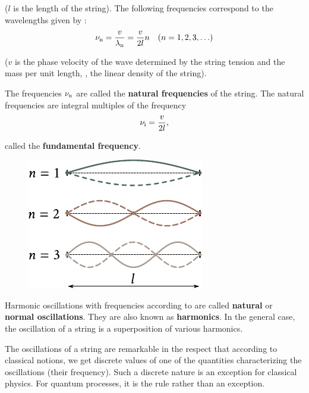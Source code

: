 \noindent
($l$ is the length of the string).
The following frequencies correspond to the wavelengths given by :
\begin{equation}\label{eq:14_61}
	\nu_{\text{n}} = \frac{v}{\lambda_{\text{n}}} = \frac{v}{2l} n \quad (n = 1, 2, 3, \ldots)
\end{equation}

\noindent
($v$ is the phase velocity of the wave determined by the string tension and the mass per unit length, \ie, the linear density of the string).

The frequencies $\nu_{\text{n}}$ are called the \textbf{natural frequencies} of the string.
The natural frequencies are integral multiples of the frequency
\begin{equation*}
	\nu_{\text{i}} = \frac{v}{2l},
\end{equation*}

\noindent
called the \textbf{fundamental frequency}.

\begin{figure}[t]
	\begin{center}
		\includegraphics[scale=1]{figures/ch_14/fig_14_12.pdf}
		\caption[]{}
		\label{fig:14_12}
	\end{center}
	\vspace{-0.8cm}
\end{figure}

Harmonic oscillations with frequencies according to  are called \textbf{natural} or \textbf{normal oscillations}.
They are also known as \textbf{harmonics}.
In the general case, the oscillation of a string is a superposition of various harmonics.

The oscillations of a string are remarkable in the respect that according to classical notions, we get discrete values of one of the quantities characterizing the oscillations (their frequency).
Such a discrete nature is an exception for classical physics.
For quantum processes, it is the rule rather than an exception.

